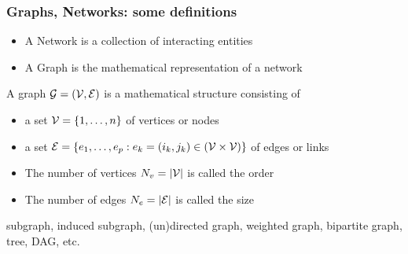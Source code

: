 \documentclass{beamer}\usepackage[]{graphicx}\usepackage[]{color}
\begin{document}
\begin{frame}
  \frametitle{Graphs, Networks: some definitions}

  \begin{definition}
    \vspace{-.25cm}
    \begin{itemize}
      \item  A \alert{Network} is a collection of interacting entities
      \item  A \alert{Graph} is the mathematical representation of a network
    \end{itemize}
  \end{definition}

  \vfill

  \begin{definition}[Graph]
    A graph $\mathcal{G}=(\mathcal{V},\mathcal{E})$ is a mathematical structure consisting of
    \begin{itemize}
      \item a set $\mathcal{V}=\left\{1,\dots,n\right\}$ of \alert{vertices} or \alert{nodes} 
      \item a set $\mathcal{E}=\left\{e_1,\dots,e_p:e_k=(i_k,j_k)\in (\mathcal{V}\times\mathcal{V})\right\}$ of \alert{edges} or \alert{links} 
      \item The number of vertices $N_v=|\mathcal{V}|$ is called the \alert{order}
      \item The number of edges $N_e=|\mathcal{E}|$ is called the \alert{size}
    \end{itemize}
  \end{definition}

  \vfill

  \begin{definition}[Vocabulary]
  subgraph,  induced subgraph, (un)directed graph, 
  weighted graph, bipartite graph, tree, DAG, etc.
  \end{definition}

\end{frame}
\end{document}

